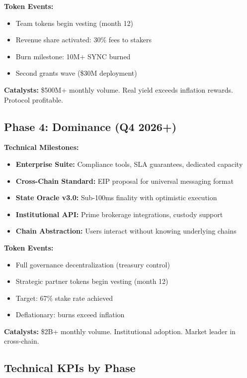 \documentclass[12pt,a4paper]{article}
\begin{document}
\textbf{Token Events:}
\begin{itemize}
    \item Team tokens begin vesting (month 12)
    \item Revenue share activated: 30\% fees to stakers
    \item Burn milestone: 10M+ SYNC burned
    \item Second grants wave (\$30M deployment)
\end{itemize}

\textbf{Catalysts:} \$500M+ monthly volume. Real yield exceeds inflation rewards. Protocol profitable.

\subsection{Phase 4: Dominance (Q4 2026+)}

\textbf{Technical Milestones:}
\begin{itemize}
    \item \textbf{Enterprise Suite:} Compliance tools, SLA guarantees, dedicated capacity
    \item \textbf{Cross-Chain Standard:} EIP proposal for universal messaging format
    \item \textbf{State Oracle v3.0:} Sub-100ms finality with optimistic execution
    \item \textbf{Institutional API:} Prime brokerage integrations, custody support
    \item \textbf{Chain Abstraction:} Users interact without knowing underlying chains
\end{itemize}

\textbf{Token Events:}
\begin{itemize}
    \item Full governance decentralization (treasury control)
    \item Strategic partner tokens begin vesting (month 12)
    \item Target: 67\% stake rate achieved
    \item Deflationary: burns exceed inflation
\end{itemize}

\textbf{Catalysts:} \$2B+ monthly volume. Institutional adoption. Market leader in cross-chain.

\subsection{Technical KPIs by Phase}
\end{document}
